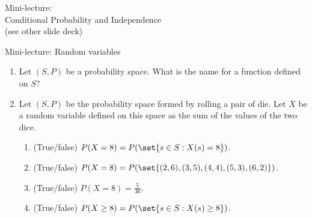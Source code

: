 \documentclass[10pt]{beamer}
\begin{document}
\begin{frame}[standout]
Mini-lecture: \\ 
Conditional Probability and Independence \\
(see other slide deck)
\end{frame}






\begin{frame}[standout]
Mini-lecture: Random variables
\end{frame}







\begin{frame}

\begin{myredbox}[title=\text{Practice Reading Quiz (Random Variables)}]


\begin{enumerate}
	\item Let $(S,P)$ be a probability space. What is the name for a function defined on $S$?
	\item Let $(S,P)$ be the probability space formed by rolling a pair of die.   Let $X$ be a random variable defined on this space as the sum of the values of the two dice. 
	\begin{enumerate}
	\item[a.] (True/false)  $P(X=8) = P(\set{s \in S : X(s) = 8})$.
	\item[b.] (True/false)  $P(X=8) = P(\set{(2,6), (3,5), (4,4), (5,3), (6,2)})$.
	\item[c.] (True/false)  $P(X=8) = \frac{5}{36}$.
	\item[d.] (True/false)
		$P(X \geq 8) = P(\set{s \in S : X(s) \geq 8})$.
	\end{enumerate}
\end{enumerate}
\end{myredbox}
\end{frame}
\end{document}

